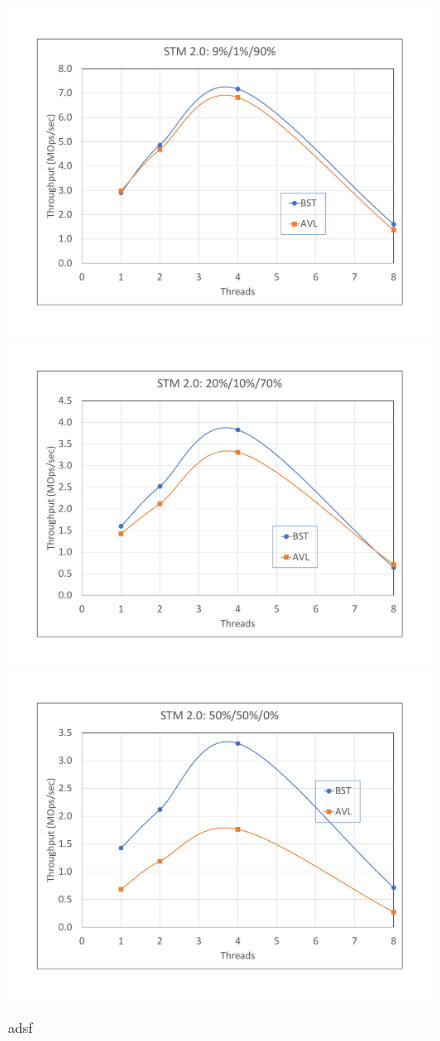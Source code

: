 \documentclass[conference]{IEEEtran}
\begin{document}
\begin{figure}[ht!]
\begin{minipage}[b][5cm][c]{\textwidth}
\includegraphics[width =.5\textwidth]{figures/stm2-9-1-90}
\includegraphics[width =.5\textwidth]{figures/stm2-20-10-70}
\includegraphics[width =.5\textwidth]{figures/stm2-50-50-0} \\
 \label{fig:fig1}
\end{minipage}%

\caption{adsf}
\end{figure}%

\iffalse
\end{document}
